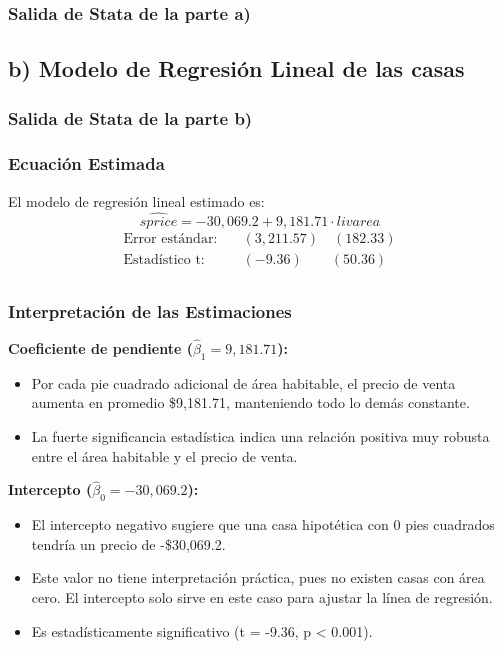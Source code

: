 \documentclass[12pt]{article}
\begin{document}
\subsubsection*{Salida de Stata de la parte a)}



\subsection*{b) Modelo de Regresión Lineal de las casas}
\subsubsection*{Salida de Stata de la parte b)}



\subsubsection*{Ecuación Estimada}
El modelo de regresión lineal estimado es:
\[
\widehat{sprice} = -30,069.2 + 9,181.71 \cdot livarea
\]
\begin{align}
\text{Error estándar:} \quad & (3,211.57) \quad (182.33) \\
\text{Estadístico t:} \quad & (-9.36) \quad\quad (50.36) \\
\end{align}

\subsubsection*{Interpretación de las Estimaciones}

\textbf{Coeficiente de pendiente ($\hat{\beta}_1 = 9,181.71$):}
\begin{itemize}
    \item Por cada pie cuadrado adicional de área habitable, el precio de venta aumenta en promedio \$9,181.71, manteniendo todo lo demás constante.
    
    \item La fuerte significancia estadística indica una relación positiva muy robusta entre el área habitable y el precio de venta.
\end{itemize}

\textbf{Intercepto ($\hat{\beta}_0 = -30,069.2$):}
\begin{itemize}
    \item El intercepto negativo sugiere que una casa hipotética con 0 pies cuadrados tendría un precio de -\$30,069.2.
    \item Este valor no tiene interpretación práctica, pues no existen casas con área cero. El intercepto solo sirve en este caso para ajustar la línea de regresión.
    \item Es estadísticamente significativo (t = -9.36, p < 0.001).
\end{itemize}
\end{document}

